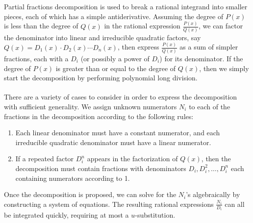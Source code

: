 \documentclass[10.5pt,twoside]{report}
\theoremstyle{definition}
\begin{document}
Partial fractions decomposition is used to break a rational integrand into smaller pieces, each of which has a simple antiderivative.   Assuming the degree of $P(x)$ is less than the degree of $Q(x)$ in the rational expression $\frac{P(x)}{Q(x)}$, we can factor the denominator into linear and irreducible quadratic factors, say $Q(x)=D_1(x)\cdot D_2(x)\cdots D_n(x)$, then express $\frac{P(x)}{Q(x)}$ as a sum of simpler fractions, each with a $D_i$ (or possibly a power of $D_i$) for its denominator. If the degree of $P(x)$ is greater than or equal to the degree of $Q(x)$, then we simply start the decomposition by performing polynomial long division.\\
${}$\\
There are a variety of cases to consider in order to express the decomposition with sufficient generality.  We assign unknown numerators $N_i$ to each of the fractions in the decomposition according to the following rules:\\

\begin{enumerate}
\item Each linear denominator must have a constant numerator, and each irreducible quadratic denominator must have a linear numerator.

\item If a repeated factor $D_i^n$ appears in the factorization of $Q(x)$, then the decomposition must contain fractions with denominators $D_i,D_i^2,\dots ,D_i^n$ each containing numerators according to 1.
\end{enumerate}


Once the decomposition is proposed, we can solve for the $N_i$'s algebraically by constructing a system of equations.  The resulting rational expressions $\frac{N_i}{D_i}$ can all be integrated quickly, requiring at most a $u$-substitution.\\
\end{document}
